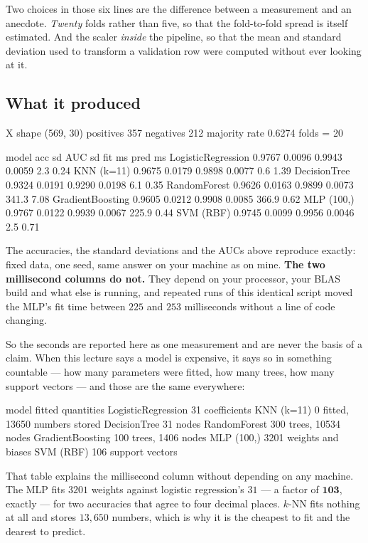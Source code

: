 \documentclass[11pt]{article}
\begin{document}
Two choices in those six lines are the difference between a measurement and an
anecdote. \emph{Twenty} folds rather than five, so that the fold-to-fold
spread is itself estimated. And the scaler \emph{inside} the pipeline, so that
the mean and standard deviation used to transform a validation row were
computed without ever looking at it.

\subsection{What it produced}

\begin{codeout}
X shape (569, 30)   positives 357   negatives 212   majority rate 0.6274
folds = 20

model                    acc      sd     AUC      sd   fit ms  pred ms
LogisticRegression    0.9767  0.0096  0.9943  0.0059      2.3     0.24
KNN (k=11)            0.9675  0.0179  0.9898  0.0077      0.6     1.39
DecisionTree          0.9324  0.0191  0.9290  0.0198      6.1     0.35
RandomForest          0.9626  0.0163  0.9899  0.0073    341.3     7.08
GradientBoosting      0.9605  0.0212  0.9908  0.0085    366.9     0.62
MLP (100,)            0.9767  0.0122  0.9939  0.0067    225.9     0.44
SVM (RBF)             0.9745  0.0099  0.9956  0.0046      2.5     0.71
\end{codeout}

\begin{caution}
The accuracies, the standard deviations and the AUCs above reproduce exactly:
fixed data, one seed, same answer on your machine as on mine. \textbf{The two
millisecond columns do not.} They depend on your processor, your BLAS build
and what else is running, and repeated runs of this identical script moved
the MLP's fit time between $225$ and $253$ milliseconds without a line of
code changing.

So the seconds are reported here as one measurement and are never the basis
of a claim. When this lecture says a model is expensive, it says so in
something countable --- how many parameters were fitted, how many trees, how
many support vectors --- and those are the same everywhere:

\begin{codeout}
  model                           fitted quantities
  LogisticRegression                31 coefficients
  KNN (k=11)           0 fitted, 13650 numbers stored
  DecisionTree                             31 nodes
  RandomForest               300 trees, 10534 nodes
  GradientBoosting            100 trees, 1406 nodes
  MLP (100,)                3201 weights and biases
  SVM (RBF)                     106 support vectors
\end{codeout}

That table explains the millisecond column without depending on any machine.
The MLP fits $3201$ weights against logistic regression's $31$ --- a factor of
$\mathbf{103}$, exactly --- for two accuracies that agree to four decimal
places. $k$-NN fits nothing at all and stores $13{,}650$ numbers, which is why
it is the cheapest to fit and the dearest to predict.
\end{caution}
\end{document}
